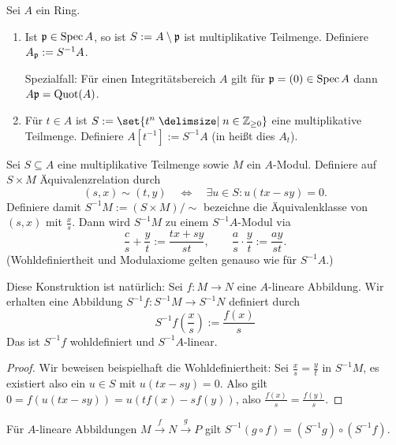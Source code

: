 \documentclass[12pt,a4paper]{scrartcl}
\theoremstyle{cplain}
\theoremstyle{cdef}
\begin{document}
\begin{bsp}
	Sei $A$ ein Ring.
	\begin{enumerate}
		\item Ist $\mathfrak{p}\in \operatorname{Spec} A$, so ist $S := A\setminus \mathfrak{p}$ ist multiplikative Teilmenge. Definiere $A_{\mathfrak{p}} := S^{-1}A$.
		
		Spezialfall: Für einen Integritätsbereich $A$ gilt für $\mathfrak{p} = (0) \in \operatorname{Spec} A$ dann $A \mathfrak{p} = \operatorname{Quot}(A)$.
		\item Für $t\in A$ ist $S := \set{t^n\given n\in\IZ_{\ge 0}}$ eine multiplikative Teilmenge. Definiere $A[t^{-1}] := S^{-1}A$ (in \cite{atiyah-macdonald} heißt dies $A_t$).
	\end{enumerate}
\end{bsp}

\begin{defi}
	Sei $S\subseteq A$ eine multiplikative Teilmenge sowie $M$ ein $A$-Modul. Definiere auf $S\times M$ Äquivalenzrelation durch
	\[(s,x)\sim (t,y) \quad \Longleftrightarrow \quad \exists u\in S: u(tx-sy) =0.\]
	Definiere damit $S^{-1}M := (S\times M)/\sim$ bezeichne die Äquivalenklasse von $(s,x)$ mit $\frac xs$. Dann wird $S^{-1}M$ zu einem $S^{-1}A$-Modul via
	\[\frac cs +\frac yt := \frac{tx+sy}{st},\qquad \frac{a}{s}\cdot \frac{y}{t} := \frac{ay}{st}.\]
	(Wohldefiniertheit und Modulaxiome gelten genauso wie für $S^{-1}A$.)
\end{defi}

\begin{bem}
	Diese Konstruktion ist natürlich: Sei $f\colon M\to N$ eine $A$-lineare Abbildung. Wir erhalten eine Abbildung $S^{-1}f\colon S^{-1}M\to S^{-1}N$ definiert durch
	\[S^{-1}f\left(\frac{x}{s}\right) := \frac{f(x)}{s}\]
	Das ist $S^{-1}f$ wohldefiniert und $S^{-1}A$-linear.
	\begin{proof}
		Wir beweisen beispielhaft die Wohldefiniertheit: Sei $\frac xs = \frac yt$ in $S^{-1}M$, es existiert also ein $u\in S$ mit $u(tx-sy) = 0$. Also gilt $0 = f(u(tx-sy)) = u(tf(x)-sf(y))$, also $\frac{f(x)}{s} = \frac{f(y)}{s}$.
	\end{proof}
	Für $A$-lineare Abbildungen $M\xrightarrow{f}N\xrightarrow{g}P$ gilt $S^{-1}(g\circ f) = (S^{-1}g)\circ(S^{-1}f)$.
\end{bem}
\end{document}
